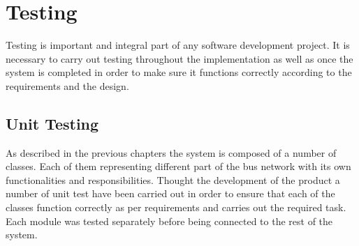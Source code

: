 \chapter{Testing}
Testing is important and integral part of any software development project. It is necessary to carry out testing throughout the implementation as well as once the system is completed in order to make sure it functions correctly according to the requirements and the design.

\section{Unit Testing} 
As described in the previous chapters the system is composed of a number of classes. Each of them representing different part of the bus network with its own functionalities and responsibilities. Thought the development of the product a number of unit test have been carried out in order to ensure that each of the classes function correctly as per requirements and carries out the required task. Each module was tested separately before being connected to the rest of the system.

